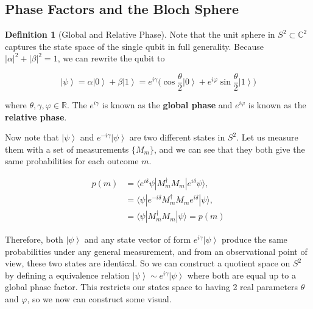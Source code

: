 \documentclass{article}
\newcommand{\ket}[1]{\ensuremath{\left|#1\right\rangle}}
\theoremstyle{definition}
\newtheorem{definition}{Definition}[section]
\begin{document}
  \subsection{Phase Factors and the Bloch Sphere}

    \begin{definition}[Global and Relative Phase]
      Note that the unit sphere in $S^2 \subset \mathbb{C}^2$ captures the state space of the single qubit in full generality. Because $|\alpha|^2 + |\beta|^2 = 1$, we can rewrite the qubit to 

      \begin{equation}
        \ket{\psi} = \alpha \ket{0} + \beta \ket{1} = e^{i \gamma} \bigg( \cos{\frac{\theta}{2}} \ket{0} + e^{i \varphi} \sin{\frac{\theta}{2}} \ket{1} \bigg) 
        \label{eq:global_phase}
      \end{equation}

      where $\theta, \gamma, \varphi \in \mathbb{R}$. The $e^{i \gamma}$ is known as the \textbf{global phase} and $e^{i \varphi}$ is known as the \textbf{relative phase}. 
    \end{definition}

    Now note that $\ket{\psi}$ and $e^{- i \gamma} \ket{\psi}$ are two different states in $S^2$. Let us measure them with a set of measurements $\{M_m\}$, and we can see that they both give the same probabilities for each outcome $m$. 
    
    \begin{align*}
      p(m) & = \langle e^{i \delta} \psi | M_m^\dagger M_m | e^{i \delta} \psi \rangle, \\
      & = \langle \psi | e^{-i \delta} M_m^\dagger M_m e^{i \delta} | \psi \rangle, \\
      & = \langle \psi | M_m^\dagger M_m | \psi \rangle = p(m)
    \end{align*}

    Therefore, both $\ket{\psi}$ and any state vector of form $e^{i \gamma} \ket{\psi}$ produce the same probabilities under any general measurement, and from an observational point of view, these two states are identical. So we can construct a quotient space on $S^2$ by defining a equivalence relation $\ket{\psi} \sim e^{i\gamma} \ket{\psi}$ where both are equal up to a global phase factor. This restricts our states space to having 2 real parameters $\theta$ and $\varphi$, so we now can construct some visual. 
\end{document}

